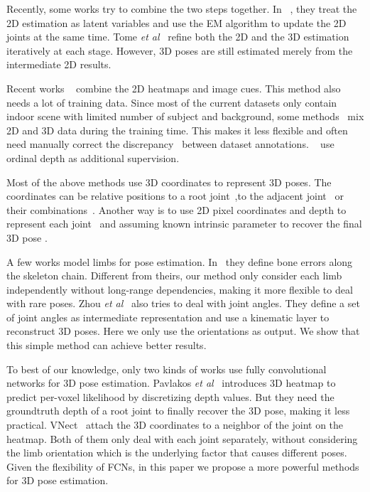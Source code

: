 \documentclass{bmvc2k}
\def\etal{\emph{et al}\bmvaOneDot}
\begin{document}
Recently, some works try to combine the two steps together. In ~\cite{zhou2016sparseness}, they treat the 2D estimation as latent variables and use the EM algorithm to update the 2D joints at the same time. Tome \etal~\cite{tome2017lifting} refine both the 2D and the 3D estimation iteratively at each stage. However, 3D poses are still estimated merely from the intermediate 2D results.

Recent works ~\cite{zhou2017weakly,sun2017compositional,tekin2016fusing} combine the 2D heatmaps and image cues. This method also needs a lot of training data. Since most of the current datasets only contain indoor scene with limited number of subject and background, some methods~\cite{zhou2017weakly,sun2017compositional} mix 2D and 3D data during the training time. This makes it less flexible and often need manually correct the discrepancy~\cite{zhou2017weakly} between dataset annotations. ~\cite{pavlakos2018ordinal,relativeposeBMVC18} use ordinal depth as additional supervision.

Most of the above methods use 3D coordinates to represent 3D poses. The coordinates can be relative positions to a root joint~\cite{tome2017lifting,martinez2017simple,VNect_SIGGRAPH2017},to the adjacent joint~\cite{li20143d} or their combinations~\cite{mono-3dhp2017}. Another way is to use 2D pixel coordinates and depth to represent each joint~\cite{pavlakos2017coarse,sun2017compositional} and assuming known intrinsic parameter to recover the final 3D pose . 

A few works model limbs for pose estimation. In~\cite{sun2017compositional} they define bone errors along the skeleton chain. Different from theirs, our method only consider each limb independently without long-range dependencies, making it more flexible to deal with rare poses.
Zhou \etal~\cite{zhou2016deep} also tries to deal with joint angles. They define a set of joint angles as intermediate representation and use a kinematic layer to reconstruct 3D poses. Here we only use the orientations as output. We show that this simple method can achieve better results.

To best of our knowledge, only two kinds of works use fully convolutional networks for 3D pose estimation. Pavlakos \etal~\cite{pavlakos2017coarse} introduces 3D heatmap to predict per-voxel likelihood by discretizing depth values. But they need the groundtruth depth of a root joint to finally recover the 3D pose, making it less practical. VNect~\cite{VNect_SIGGRAPH2017} attach the 3D coordinates to a neighbor of the joint on the heatmap. 
Both of them only deal with each joint separately, without considering the limb orientation which is the underlying factor that causes different poses. Given the flexibility of FCNs, in this paper we propose a more powerful methods for 3D pose estimation.
\end{document}

